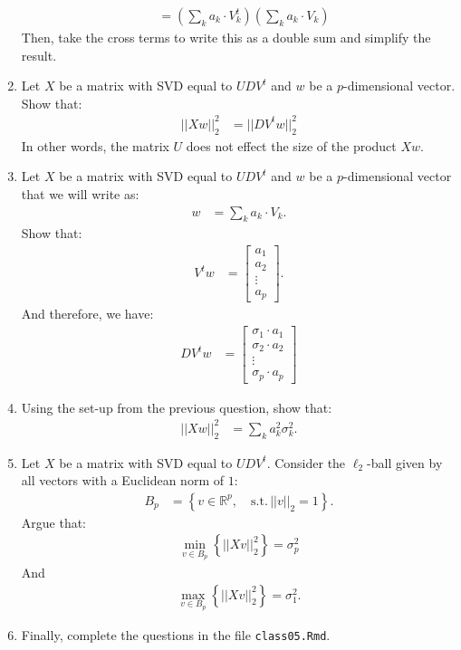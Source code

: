 \documentclass[12pt,hidelinks]{article}
\numberwithin{equation}{section}
\begin{document}
\begin{enumerate}
\begin{align}
&= \left(\sum_k a_k \cdot V_k^t \right) \left(\sum_k a_k \cdot V_k \right)
\end{align}
Then, take the cross terms to write this as a double sum and simplify the
result.
\item Let $X$ be a matrix with SVD equal to $UDV^t$ and $w$ be a
$p$-dimensional vector. Show that:
\begin{align}
|| X w ||_2^2 &= || D V^t w ||_2^2
\end{align}
In other words, the matrix $U$ does not effect the size of the product $X w$.
\item Let $X$ be a matrix with SVD equal to $UDV^t$ and $w$ be a
$p$-dimensional vector that we will write as:
\begin{align}
w &= \sum_k a_k \cdot V_k.
\end{align}
Show that:
\begin{align}
V^t w &= \begin{bmatrix} a_1 \\ a_2 \\ \vdots \\ a_p \end{bmatrix}.
\end{align}
And therefore, we have:
\begin{align}
D V^t w &= \begin{bmatrix} \sigma_1 \cdot a_1 \\ \sigma_2 \cdot a_2 \\ \vdots \\ \sigma_p \cdot a_p \end{bmatrix}
\end{align}
\item Using the set-up from the previous question, show that:
\begin{align}
|| X w ||_2^2 &= \sum_k a_k^2 \sigma_k^2.
\end{align}
\item Let $X$ be a matrix with SVD equal to $UDV^t$. Consider the $\ell_2$-ball
given by all vectors with a Euclidean norm of $1$:
\begin{align}
B_p &= \left\{ v \in \mathbb{R}^p, \quad \text{s.t.} \, ||v||_2 = 1 \right\}.
\end{align}
Argue that:
\begin{align}
\min_{v \in B_p} \left\{ || X v ||_2^2 \right\} = \sigma_p^2
\end{align}
And
\begin{align}
\max_{v \in B_p} \left\{ || X v ||_2^2 \right\} = \sigma_1^2.
\end{align}
\item Finally, complete the questions in the file \texttt{class05.Rmd}.


\end{enumerate}
\end{document}
